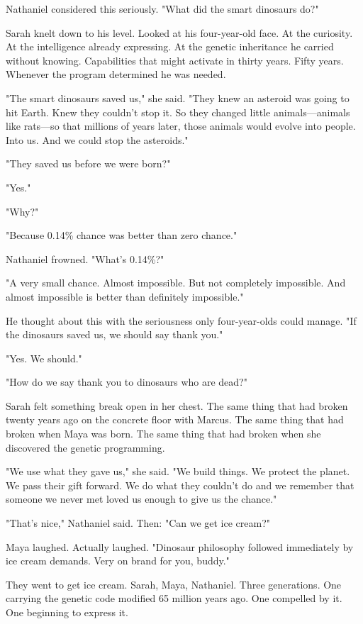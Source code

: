 Nathaniel considered this seriously. "What did the smart dinosaurs do?"

Sarah knelt down to his level. Looked at his four-year-old face. At the curiosity. At the intelligence already expressing. At the genetic inheritance he carried without knowing. Capabilities that might activate in thirty years. Fifty years. Whenever the program determined he was needed.

"The smart dinosaurs saved us," she said. "They knew an asteroid was going to hit Earth. Knew they couldn't stop it. So they changed little animals—animals like rats—so that millions of years later, those animals would evolve into people. Into us. And we could stop the asteroids."

"They saved us before we were born?"

"Yes."

"Why?"

"Because 0.14\% chance was better than zero chance."

Nathaniel frowned. "What's 0.14\%?"

"A very small chance. Almost impossible. But not completely impossible. And almost impossible is better than definitely impossible."

He thought about this with the seriousness only four-year-olds could manage. "If the dinosaurs saved us, we should say thank you."

"Yes. We should."

"How do we say thank you to dinosaurs who are dead?"

Sarah felt something break open in her chest. The same thing that had broken twenty years ago on the concrete floor with Marcus. The same thing that had broken when Maya was born. The same thing that had broken when she discovered the genetic programming.

"We use what they gave us," she said. "We build things. We protect the planet. We pass their gift forward. We do what they couldn't do and we remember that someone we never met loved us enough to give us the chance."

"That's nice," Nathaniel said. Then: "Can we get ice cream?"

Maya laughed. Actually laughed. "Dinosaur philosophy followed immediately by ice cream demands. Very on brand for you, buddy."

They went to get ice cream. Sarah, Maya, Nathaniel. Three generations. One carrying the genetic code modified 65 million years ago. One compelled by it. One beginning to express it.

